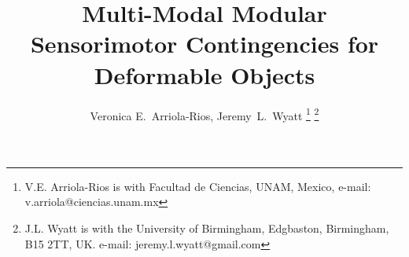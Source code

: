 \documentclass[journal]{IEEEtran}
\begin{document}
%
\title{Multi-Modal Modular Sensorimotor Contingencies for Deformable Objects
}
%
%
%

\author{Veronica E.~Arriola-Rios,
        Jeremy~L.~Wyatt \thanks{V.E. Arriola-Rios is with Facultad de Ciencias, UNAM, Mexico, e-mail: v.arriola@ciencias.unam.mx}
        \thanks{J.L. Wyatt is with the University of Birmingham, Edgbaston, Birmingham, B15 2TT, UK. e-mail: jeremy.l.wyatt@gmail.com }}%

% 
%
\end{document}
